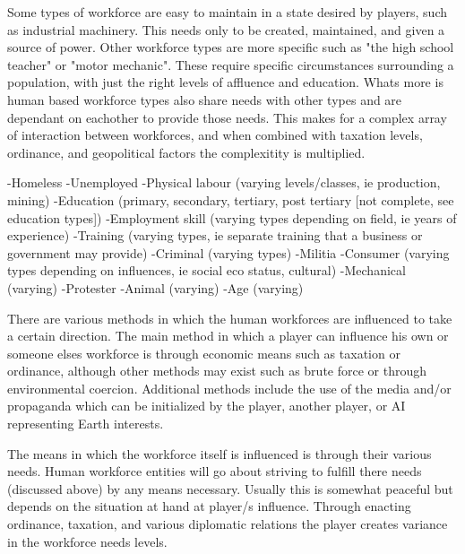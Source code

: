 Some types of workforce are easy to maintain in a state desired by players, such as industrial machinery. This needs only to be created, maintained, and given a source of power. Other workforce types are more specific such as "the high school teacher" or "motor mechanic". These require specific circumstances surrounding a population, with just the right levels of affluence and education. Whats more is human based workforce types also share needs with other types and are dependant on eachother to provide those needs. This makes for a complex array of interaction between workforces, and when combined with taxation levels, ordinance, and geopolitical factors the complexitity is multiplied.


-Homeless
-Unemployed
-Physical labour (varying levels/classes, ie production, mining)
-Education (primary, secondary, tertiary, post tertiary [not complete, see education types])
-Employment skill (varying types depending on field, ie years of experience)
-Training (varying types, ie separate training that a business or government may provide)
-Criminal (varying types)
-Militia
-Consumer (varying types depending on influences, ie social eco status, cultural)
-Mechanical (varying) 
-Protester
-Animal (varying)
-Age (varying)







There are various methods in which the human workforces are influenced to take a certain direction. The main method in which a player can influence his own or someone elses workforce is through economic means such as taxation or ordinance, although other methods may exist such as brute force or through environmental coercion. Additional methods include the use of the media and/or propaganda which can be initialized by the player, another player, or AI representing Earth interests.

The means in which the workforce itself is influenced is through their various needs. Human workforce entities will go about striving to fulfill there needs (discussed above) by any means necessary. Usually this is somewhat peaceful but depends on the situation at hand at player/s influence. Through enacting ordinance, taxation, and various diplomatic relations the player creates variance in the workforce needs levels. 

